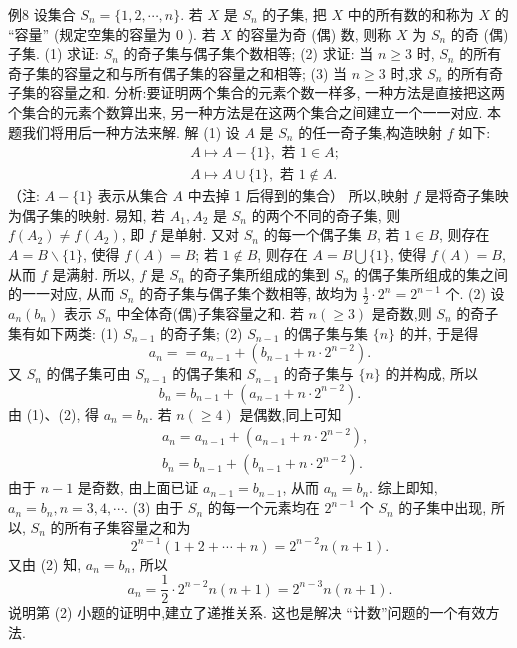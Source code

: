 例8 设集合 $S_n=\{1,2, \cdots, n\}$. 若 $X$ 是 $S_n$ 的子集, 把 $X$ 中的所有数的和称为 $X$ 的 “容量” (规定空集的容量为 0 ). 若 $X$ 的容量为奇 (偶) 数, 则称 $X$ 为 $S_n$ 的奇 (偶) 子集.
(1) 求证: $S_n$ 的奇子集与偶子集个数相等;
(2) 求证: 当 $n \geqslant 3$ 时, $S_n$ 的所有奇子集的容量之和与所有偶子集的容量之和相等;
(3) 当 $n \geqslant 3$ 时,求 $S_n$ 的所有奇子集的容量之和.
分析:要证明两个集合的元素个数一样多, 一种方法是直接把这两个集合的元素个数算出来, 另一种方法是在这两个集合之间建立一个一一对应.
本题我们将用后一种方法来解.
解 (1) 设 $A$ 是 $S_n$ 的任一奇子集,构造映射 $f$ 如下:
$$
\begin{aligned}
& A \mapsto A-\{1\}, \text { 若 } 1 \in A ; \\
& A \mapsto A \cup\{1\}, \text { 若 } 1 \notin A .
\end{aligned}
$$
（注: $A-\{1\}$ 表示从集合 $A$ 中去掉 1 后得到的集合）
所以,映射 $f$ 是将奇子集映为偶子集的映射.
易知, 若 $A_1, A_2$ 是 $S_n$ 的两个不同的奇子集, 则 $f\left(A_2\right) \neq f\left(A_2\right)$, 即 $f$ 是单射.
又对 $S_n$ 的每一个偶子集 $B$, 若 $1 \in B$, 则存在 $A=B \backslash\{1\}$, 使得 $f(A)=B$; 若 $1 \notin B$, 则存在 $A=B \bigcup\{1\}$, 使得 $f(A)=B$, 从而 $f$ 是满射.
所以, $f$ 是 $S_n$ 的奇子集所组成的集到 $S_n$ 的偶子集所组成的集之间的一一对应, 从而 $S_n$ 的奇子集与偶子集个数相等, 故均为 $\frac{1}{2} \cdot 2^n=2^{n-1}$ 个.
(2) 设 $a_n\left(b_n\right)$ 表示 $S_n$ 中全体奇(偶)子集容量之和.
若 $n(\geqslant 3)$ 是奇数,则 $S_n$ 的奇子集有如下两类: (1) $S_{n-1}$ 的奇子集; (2) $S_{n-1}$ 的偶子集与集 $\{n\}$ 的并, 于是得
$$
a_n==a_{n-1}+\left(b_{n-1}+n \cdot 2^{n-2}\right) .
$$
又 $S_n$ 的偶子集可由 $S_{n-1}$ 的偶子集和 $S_{n-1}$ 的奇子集与 $\{n\}$ 的并构成, 所以
$$
b_n=b_{n-1}+\left(a_{n-1}+n \cdot 2^{n-2}\right) .
$$
由 (1)、(2), 得 $a_n=b_n$.
若 $n(\geqslant 4)$ 是偶数,同上可知
$$
\begin{aligned}
& a_n=a_{n-1}+\left(a_{n-1}+n \cdot 2^{n-2}\right), \\
& b_n=b_{n-1}+\left(b_{n-1}+n \cdot 2^{n-2}\right) .
\end{aligned}
$$
由于 $n-1$ 是奇数, 由上面已证 $a_{n-1}=b_{n-1}$, 从而 $a_n=b_n$.
综上即知, $a_n=b_n, n=3,4, \cdots$.
(3) 由于 $S_n$ 的每一个元素均在 $2^{n-1}$ 个 $S_n$ 的子集中出现, 所以, $S_n$ 的所有子集容量之和为
$$
2^{n-1}(1+2+\cdots+n)=2^{n-2} n(n+1) .
$$
又由 (2) 知, $a_n=b_n$, 所以
$$
a_n=\frac{1}{2} \cdot 2^{n-2} n(n+1)=2^{n-3} n(n+1) .
$$
说明第 (2) 小题的证明中,建立了递推关系.
这也是解决 “计数”问题的一个有效方法.




